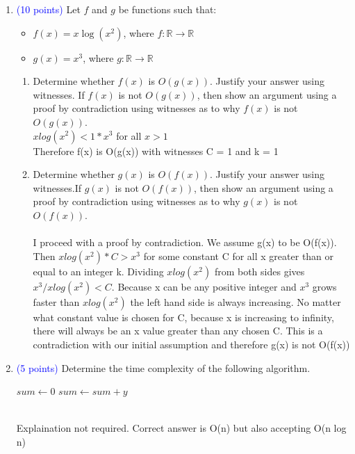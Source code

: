 \documentclass{article}
\newcommand{\pt}[1]{\textcolor{blue}{(#1 points)}}
\begin{document}
\begin{enumerate}
\item \pt{10} {Let $f$ and $g$ be functions such that:}
\begin{itemize}
    \item $f(x) = x \log(x^2)$, where $f:\mathbb{R}\to\mathbb{R}$
    \item $g(x) = x^3$, where $g:\mathbb{R}\to\mathbb{R}$
\end{itemize}
\begin{enumerate}
    \item Determine whether $f(x)$ is $O(g(x))$. Justify your answer using witnesses. If $f(x)$ is not $O(g(x))$, then show an argument using a proof by contradiction using witnesses as to why $f(x)$ is not $O(g(x))$.
    \\$x log(x^2) < 1 * x^3$ for all $x > 1$
    \\ Therefore f(x) is O(g(x)) with witnesses C = 1 and k = 1
    \item Determine whether $g(x)$ is $O(f(x))$. Justify your answer using witnesses.If $g(x)$ is not $O(f(x))$, then show an argument using a proof by contradiction using witnesses as to why $g(x)$ is not $O(f(x))$.
    \\\\I proceed with a proof by contradiction. We assume g(x) to be O(f(x)).\\Then $x log(x^2) * C > x^3$ for some constant C for all x greater than or equal to an integer k. Dividing $x log(x^2)$ from both sides gives $x^3 / x log(x^2) < C$. Because x can be any positive integer and $x^3$ grows faster than $x log(x^2)$ the left hand side is always increasing. No matter what constant value is chosen for C, because x is increasing to infinity, there will always be an x value greater than any chosen C. This is a contradiction with our initial assumption and therefore g(x) is not O(f(x))
\end{enumerate}

\item \pt{5} {Determine the time complexity of the following algorithm.}
    \begin{algorithmic}
    \State $sum \gets 0$
            \State $sum \gets sum + y$
        \EndFor
    \EndFor
    \end{algorithmic}
\\Explaination not required. Correct answer is O(n) but also accepting O(n log n)
\end{enumerate}
\end{document}
